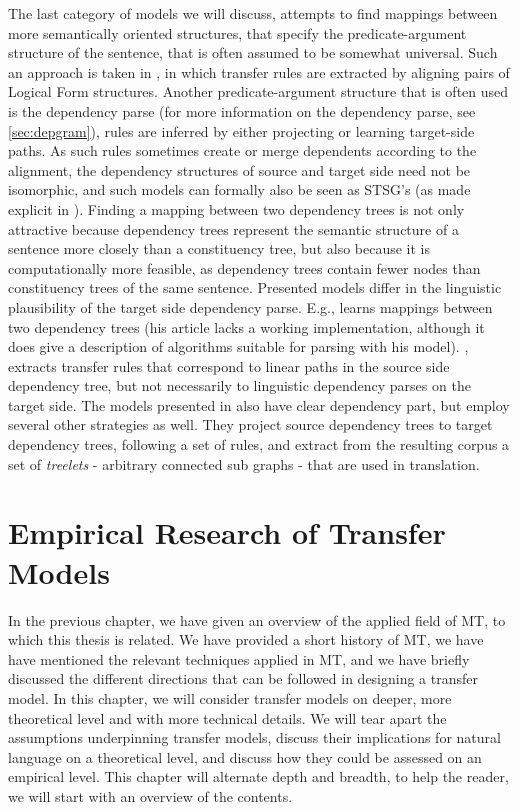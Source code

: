 \documentclass{report}
\theoremstyle{definition}
\theoremstyle{plain}
\begin{document}
The last category of models we will discuss, attempts to find mappings between more semantically oriented structures, that specify the predicate-argument structure of the sentence, that is often assumed to be somewhat universal. Such an approach is taken in \cite{menezes2003best}, in which transfer rules are extracted by aligning pairs of Logical Form structures. Another predicate-argument structure that is often used is the dependency parse (for more information on the dependency parse, see \ref{sec:depgram}), rules are inferred by either projecting or learning target-side paths. As such rules sometimes create or merge dependents according to the alignment, the dependency structures of source and target side need not be isomorphic, and such models can formally also be seen as STSG's (as made explicit in \cite{eisner2003learning}). Finding a mapping between two dependency trees is not only attractive because dependency trees represent the semantic structure of a sentence more closely than a constituency tree, but also because it is computationally more feasible, as dependency trees contain fewer nodes than constituency trees of the same sentence. Presented models differ in the linguistic plausibility of the target side dependency parse. E.g., \cite{eisner2003learning} learns mappings between two dependency trees (his article lacks a working implementation, although it does give a description of algorithms suitable for parsing with his model). \cite{lin2004path}, extracts transfer rules that correspond to linear paths in the source side dependency tree, but not necessarily to linguistic dependency parses on the target side. The models presented in \cite{quirk2005dependency,quirk2006dependency,quirk2006we} also have clear dependency part, but employ several other strategies as well. They project source dependency trees to target dependency trees, following a set of rules, and extract from the resulting corpus a set of \textit{treelets} - arbitrary connected sub graphs - that are used in translation.

 
 
 
\chapter{Empirical Research of Transfer Models}
\label{ch:empirical} 

In the previous chapter, we have given an overview of the applied field of MT, to which this thesis is related. We have provided a short history of MT, we have have mentioned the relevant techniques applied in MT, and we have briefly discussed the different directions that can be followed in designing a transfer model. In this chapter, we will consider transfer models on deeper, more theoretical level and with more technical details. We will tear apart the assumptions underpinning transfer models, discuss their implications for natural language on a theoretical level, and discuss how they could be assessed on an empirical level. This chapter will alternate depth and breadth, to help the reader, we will start with an overview of the contents.
\end{document}
